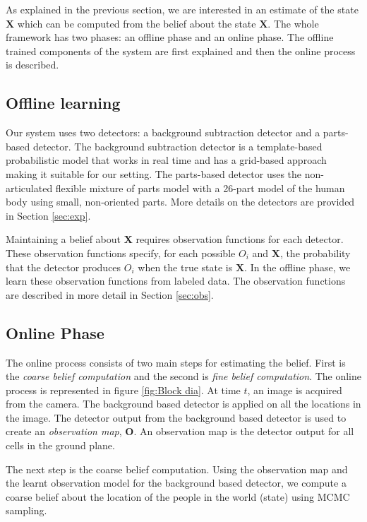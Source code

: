 \documentclass[10pt,twocolumn,letterpaper]{article}
\begin{document}
As explained in the previous section, we are interested in an estimate of the state $\textbf{X}$ which can be computed from the belief about the state $\textbf{X}$. The whole framework has two phases: an offline phase and an online phase. The offline trained components of the system are first explained and then the online process is described.

 \subsection{Offline learning}
 
Our system uses two detectors: a background subtraction detector and a parts-based detector.  The background subtraction detector is a template-based probabilistic model \cite{englebienneFast}  that works in real time and has a grid-based approach making it suitable for our setting.  The parts-based detector uses the non-articulated flexible mixture of parts model \cite{partsDeva} with a 26-part model of the human body using small, non-oriented parts.
More details on the detectors are provided in Section \ref{sec:exp}.

Maintaining a belief about $\mathbf{X}$ requires observation functions for each detector.  These observation functions specify, for each possible $O_i$ and $\mathbf{X}$, the probability that the detector produces $O_i$ when the true state is $\mathbf{X}$.  In the offline phase, we learn these observation functions from labeled data.  The observation functions are described in more detail in Section \ref{sec:obs}.

\subsection{Online Phase}
The online process consists of two main steps for estimating the belief. First is the \textit{coarse belief computation} and the second is \textit{fine belief computation}. The online process is represented in figure \ref{fig:Block dia}.
At time $t $, an image is acquired from the camera. The background based detector is applied on all the locations in the image. The detector output from the background based detector is used to create an \textit{observation map}, $\textbf{O}$. An observation map is the detector output for all cells in the ground plane.  

The next step is the coarse belief computation. Using the observation map and the learnt observation model for the background based detector, we compute a coarse belief about the location of the people in the world (state) using MCMC sampling.
\end{document}
